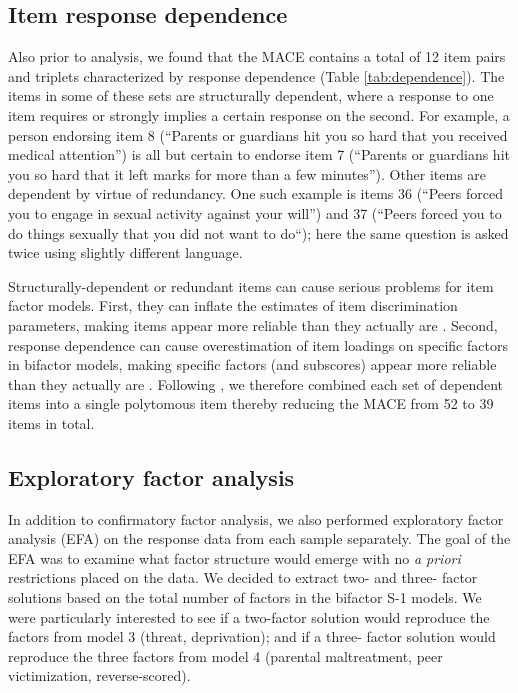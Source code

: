 \documentclass[letterpaper,man,natbib,longtable,floatsintext,12pt]{apa6}
\begin{document}
\subsection*{Item response dependence}

Also prior to analysis, we found that the MACE contains a total of 12 item pairs and triplets characterized by response dependence (Table \ref{tab:dependence}). The items in some of these sets are structurally dependent, where a response to one item requires or strongly implies a certain response on the second. For example, a person endorsing item 8 (``Parents or guardians hit you so hard that you received medical attention'') is all but certain to endorse item 7 (``Parents or guardians hit you so hard that it left marks for more than a few minutes''). Other items are dependent by virtue of redundancy. One such example is items 36 (``Peers forced you to engage in sexual activity against your will'') and 37 (``Peers forced you to do things sexually that you did not want to do``); here the same question is asked twice using slightly different language.

Structurally-dependent or redundant items can cause serious problems for item factor models. First, they can inflate the estimates of item discrimination parameters, making items appear more reliable than they actually are . Second, response dependence can cause overestimation of item loadings on specific factors in bifactor models, making specific factors (and subscores) appear more reliable than they actually are . Following , we therefore combined each set of dependent items into a single polytomous item thereby reducing the MACE from 52 to 39 items in total.

\subsection{Exploratory factor analysis}

In addition to confirmatory factor analysis, we also performed exploratory factor analysis (EFA) on the response data from each sample separately. The goal of the EFA was to examine what factor structure would emerge with no \emph{a priori} restrictions placed on the data. We decided to extract two- and three- factor solutions based on the total number of factors in the bifactor S-1 models. We were particularly interested to see if a two-factor solution would reproduce the factors from model 3 (threat, deprivation); and if a three- factor solution would reproduce the three factors from model 4 (parental maltreatment, peer victimization, reverse-scored). 
\end{document}
